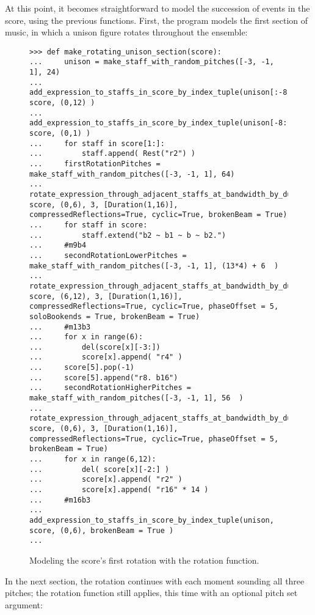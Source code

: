 At this point, it becomes straightforward to model the succession of events in the score, using the previous functions. First, the program models the first section of music, in which a unison figure rotates throughout the ensemble:
\begin{figure}[H]
\begin{lstlisting}[basicstyle=\scriptsize\ttfamily, breaklines=True, tabsize=4, showtabs=false, showspaces=false]
>>> def make_rotating_unison_section(score):
...     unison = make_staff_with_random_pitches([-3, -1, 1], 24)    
...     add_expression_to_staffs_in_score_by_index_tuple(unison[:-8], score, (0,12) )   
...     add_expression_to_staffs_in_score_by_index_tuple(unison[-8:], score, (0,1) )
...     for staff in score[1:]:
...         staff.append( Rest("r2") )
...     firstRotationPitches = make_staff_with_random_pitches([-3, -1, 1], 64)
...     rotate_expression_through_adjacent_staffs_at_bandwidth_by_durations(firstRotationPitches, score, (0,6), 3, [Duration(1,16)], compressedReflections=True, cyclic=True, brokenBeam = True)
...     for staff in score:
...         staff.extend("b2 ~ b1 ~ b ~ b2.")
...     #m9b4
...     secondRotationLowerPitches = make_staff_with_random_pitches([-3, -1, 1], (13*4) + 6  )  
...     rotate_expression_through_adjacent_staffs_at_bandwidth_by_durations(secondRotationLowerPitches, score, (6,12), 3, [Duration(1,16)], compressedReflections=True, cyclic=True, phaseOffset = 5, soloBookends = True, brokenBeam = True)
...     #m13b3
...     for x in range(6):
...         del(score[x][-3:])
...         score[x].append( "r4" )
...     score[5].pop(-1)
...     score[5].append("r8. b16")
...     secondRotationHigherPitches = make_staff_with_random_pitches([-3, -1, 1], 56  ) 
...     rotate_expression_through_adjacent_staffs_at_bandwidth_by_durations(secondRotationHigherPitches, score, (0,6), 3, [Duration(1,16)], compressedReflections=True, cyclic=True, phaseOffset = 5, brokenBeam = True)
...     for x in range(6,12):
...         del( score[x][-2:] )
...         score[x].append( "r2" )
...         score[x].append( "r16" * 14 )
...     #m16b3
...     add_expression_to_staffs_in_score_by_index_tuple(unison, score, (0,6), brokenBeam = True )
... \end{lstlisting}

\caption{Modeling the score's first rotation with the rotation function. } 
\end{figure}

In the next section, the rotation continues with each moment sounding all three pitches; the rotation function still applies, this time with an optional pitch set argument:

